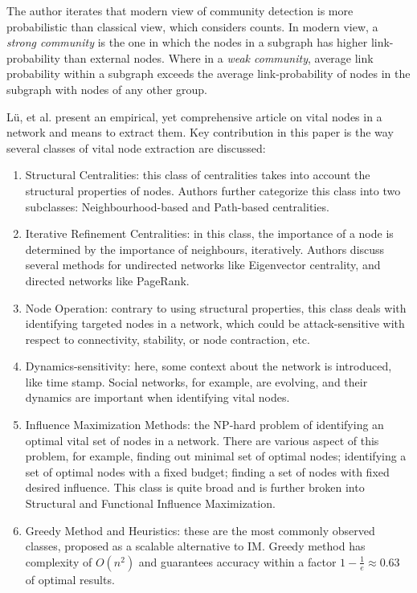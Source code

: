 	The author iterates that modern view of community detection is more probabilistic than classical view, which considers counts. In modern view, a \textit{strong community} is the one in which the nodes in a subgraph has higher link-probability than external nodes. Where in a \textit{weak community}, average link probability within a subgraph exceeds the average link-probability of nodes in the subgraph with nodes of any other group.
	
	Lü, et al. \cite{lu2011} present an empirical, yet comprehensive article on vital nodes in a network and means to extract them. Key contribution in this paper is the way several classes of vital node extraction are discussed:
	
	\begin{enumerate}
		\item Structural Centralities: this class of centralities takes into account the structural properties of nodes. Authors further categorize this class into two subclasses: Neighbourhood-based and Path-based centralities.
		
		\item Iterative Refinement Centralities: in this class, the importance of a node is determined by the importance of neighbours, iteratively. Authors discuss several methods for undirected networks like Eigenvector centrality, and directed networks like PageRank.
		
		\item Node Operation: contrary to using structural properties, this class deals with identifying targeted nodes in a network, which could be attack-sensitive with respect to connectivity, stability, or node contraction, etc.
		
		\item Dynamics-sensitivity: here, some context about the network is introduced, like time stamp. Social networks, for example, are evolving, and their dynamics are important when identifying vital nodes.
		
		\item Influence Maximization Methods: the NP-hard problem of identifying an optimal vital set of nodes in a network. There are various aspect of this problem, for example, finding out minimal set of optimal nodes; identifying a set of optimal nodes with a fixed budget; finding a set of nodes with fixed desired influence. This class is quite broad and is further broken into Structural and Functional Influence Maximization.
		
		\item Greedy Method and Heuristics: these are the most commonly observed classes, proposed as a scalable alternative to IM. Greedy method has complexity of $O(n^2)$ and guarantees accuracy within a factor $1-\frac{1}{e}\approx 0.63$ of optimal results.
	\end{enumerate}
	
